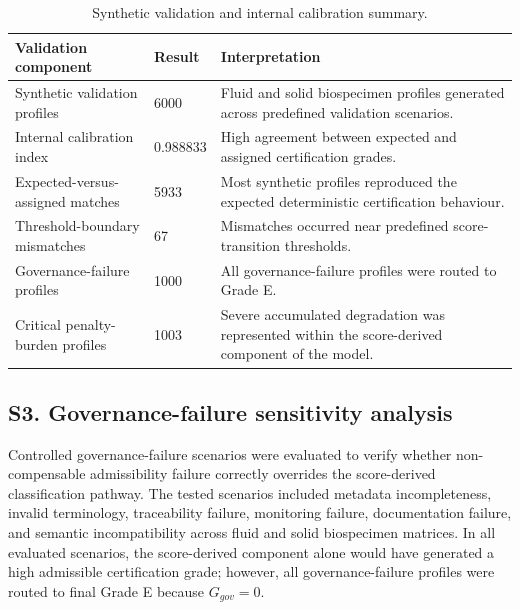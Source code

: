 \documentclass[preprint,12pt]{elsarticle}
\begin{document}
\begin{table}[!htbp]
\caption{Synthetic validation and internal calibration summary.}
\label{tab:synthetic_validation_details}
\centering
\footnotesize
\setlength{\tabcolsep}{4pt}
\renewcommand{\arraystretch}{1.10}

\begin{tabular}{@{}L{4.8cm}C{2.2cm}L{6.8cm}@{}}
\toprule
\textbf{Validation component}
& \textbf{Result}
& \textbf{Interpretation} \\
\midrule

Synthetic validation profiles
& 6000
& Fluid and solid biospecimen profiles generated across predefined validation scenarios. \\

Internal calibration index
& 0.988833
& High agreement between expected and assigned certification grades. \\

Expected-versus-assigned matches
& 5933
& Most synthetic profiles reproduced the expected deterministic certification behaviour. \\

Threshold-boundary mismatches
& 67
& Mismatches occurred near predefined score-transition thresholds. \\

Governance-failure profiles
& 1000
& All governance-failure profiles were routed to Grade E. \\

Critical penalty-burden profiles
& 1003
& Severe accumulated degradation was represented within the score-derived component of the model. \\

\bottomrule
\end{tabular}
\end{table}

\FloatBarrier

\subsection*{S3. Governance-failure sensitivity analysis}

Controlled governance-failure scenarios were evaluated to verify whether non-compensable admissibility failure correctly overrides the score-derived classification pathway. The tested scenarios included metadata incompleteness, invalid terminology, traceability failure, monitoring failure, documentation failure, and semantic incompatibility across fluid and solid biospecimen matrices. In all evaluated scenarios, the score-derived component alone would have generated a high admissible certification grade; however, all governance-failure profiles were routed to final Grade E because \(G_{gov}=0\).
\end{document}
